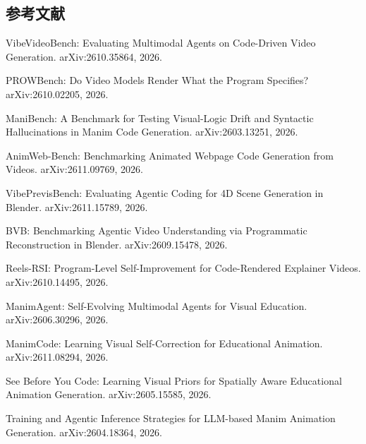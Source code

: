 \begin{refs}
\section*{参考文献}
\small

\begin{enumerate}[label={[\arabic*]},leftmargin=2.1em,itemsep=1pt,topsep=2pt]

\item VibeVideoBench: Evaluating Multimodal Agents on Code-Driven Video Generation.
  arXiv:2610.35864, 2026.

\item PROWBench: Do Video Models Render What the Program Specifies?
  arXiv:2610.02205, 2026.

\item ManiBench: A Benchmark for Testing Visual-Logic Drift and Syntactic
  Hallucinations in Manim Code Generation. arXiv:2603.13251, 2026.

\item AnimWeb-Bench: Benchmarking Animated Webpage Code Generation from Videos.
  arXiv:2611.09769, 2026.

\item VibePrevisBench: Evaluating Agentic Coding for 4D Scene Generation in Blender.
  arXiv:2611.15789, 2026.

\item BVB: Benchmarking Agentic Video Understanding via Programmatic Reconstruction
  in Blender. arXiv:2609.15478, 2026.

\item Reels-RSI: Program-Level Self-Improvement for Code-Rendered Explainer Videos.
  arXiv:2610.14495, 2026.

\item ManimAgent: Self-Evolving Multimodal Agents for Visual Education.
  arXiv:2606.30296, 2026.

\item ManimCode: Learning Visual Self-Correction for Educational Animation.
  arXiv:2611.08294, 2026.

\item See Before You Code: Learning Visual Priors for Spatially Aware Educational
  Animation Generation. arXiv:2605.15585, 2026.

\item Training and Agentic Inference Strategies for LLM-based Manim Animation
  Generation. arXiv:2604.18364, 2026.


\end{enumerate}
\end{refs}
